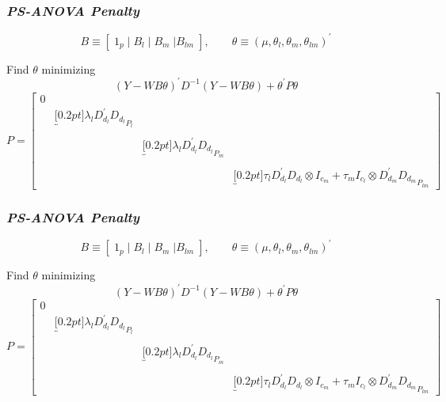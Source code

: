 \documentclass[12pt]{beamer}
\newcommand{\ms}{\scriptscriptstyle}
\begin{document}
\begin{frame}
\frametitle{\emph{PS-ANOVA Penalty}}

\[
B \equiv \left[\; 1_p \; \vert \;  B_l  \; \vert \;   B_m \; \vert B_{\ms{lm}} \; \right] ,   \qquad  \theta \equiv \left(\mu, \theta_{\ms{l}},\theta_{\ms{m}},\theta_{\ms{lm}}\right)^\prime            
\]

Find $\theta$ minimizing
\begin{equation*}
\left(Y-WB\theta\right)^\prime D^{-1}\left(Y-WB\theta\right) + \theta^\prime P \theta
\end{equation*}
\begin{equation*}
P  = \begin{bmatrix}
0 &&&\\
& \underbracket[0.2pt]{\lambda_l D_{\ms{d_l}}^\prime D_{\ms{d_l}}}_{\text{$P_{\ms l}$}}	& 	& \\
&&& \\
&	&	\underbracket[0.2pt]{\lambda_l D_{\ms{d_l}}^\prime D_{\ms{d_l}}}_{\text{$P_{\ms m}$}}	& 	\\
&&&\\
&&&	\underbracket[0.2pt]{\tau_l D_{\ms{d_l}}^\prime D_{\ms{d_l}} \otimes I_{\ms{c_m}} + \tau_m I_{\ms{c_l}} \otimes D_{\ms{d_m}}^\prime D_{\ms{d_m}}}_{\text{$P_{\ms lm}$}}
\end{bmatrix}
\end{equation*}


\end{frame}








\begin{frame}
\frametitle{\emph{PS-ANOVA Penalty}}

\[
B \equiv \left[\; 1_p \; \vert \;  B_l  \; \vert \;   B_m \; \vert B_{\ms{lm}} \; \right] ,   \qquad  \theta \equiv \left(\mu, \theta_{\ms{l}},\theta_{\ms{m}},\theta_{\ms{lm}}\right)^\prime            
\]

Find $\theta$ minimizing
\begin{equation} \label{eq:PS-ANOVA}
\left(Y-WB\theta\right)^\prime D^{-1} \left(Y-WB\theta\right) + \theta^\prime P \theta
\end{equation}
\begin{equation*}
P  = \begin{bmatrix}
0 &&&\\
& \underbracket[0.2pt]{\lambda_l D_{\ms{d_l}}^\prime D_{\ms{d_l}}}_{\text{$P_{\ms l}$}}	& 	& \\
&&& \\
&	&	\underbracket[0.2pt]{\lambda_l D_{\ms{d_l}}^\prime D_{\ms{d_l}}}_{\text{$P_{\ms m}$}}	& 	\\
&&&\\
&&&	\underbracket[0.2pt]{\tau_l D_{\ms{d_l}}^\prime D_{\ms{d_l}} \otimes I_{\ms{c_m}} + \tau_m I_{\ms{c_l}} \otimes D_{\ms{d_m}}^\prime D_{\ms{d_m}}}_{\text{$P_{\ms lm}$}}
\end{bmatrix}
\end{equation*}

\end{frame}
\end{document}
